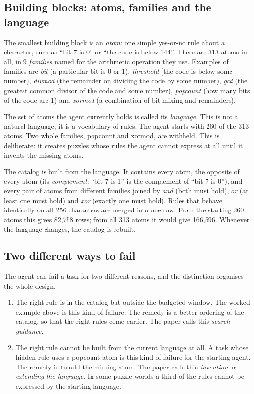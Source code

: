\documentclass[11pt]{article}
\begin{document}
\subsection{Building blocks: atoms, families and the language}

The smallest building block is an \emph{atom}: one simple yes-or-no rule about a character, such as ``bit 7 is 0'' or ``the code is below 144''. There are 313 atoms in all, in 9 \emph{families} named for the arithmetic operation they use. Examples of families are \emph{bit} (a particular bit is 0 or 1), \emph{threshold} (the code is below some number), \emph{divmod} (the remainder on dividing the code by some number), \emph{gcd} (the greatest common divisor of the code and some number), \emph{popcount} (how many bits of the code are 1) and \emph{xormod} (a combination of bit mixing and remainders).

The set of atoms the agent currently holds is called its \emph{language}. This is not a natural language; it is a vocabulary of rules. The agent starts with 260 of the 313 atoms. Two whole families, popcount and xormod, are withheld. This is deliberate: it creates puzzles whose rules the agent cannot express at all until it invents the missing atoms.

The catalog is built from the language. It contains every atom, the opposite of every atom (its \emph{complement}: ``bit 7 is 1'' is the complement of ``bit 7 is 0''), and every pair of atoms from different families joined by \emph{and} (both must hold), \emph{or} (at least one must hold) and \emph{xor} (exactly one must hold). Rules that behave identically on all 256 characters are merged into one row. From the starting 260 atoms this gives 82,758 rows; from all 313 atoms it would give 166,596. Whenever the language changes, the catalog is rebuilt.

\subsection{Two different ways to fail}

The agent can fail a task for two different reasons, and the distinction organises the whole design.

\begin{enumerate}[leftmargin=*]
\item The right rule is in the catalog but outside the budgeted window. The worked example above is this kind of failure. The remedy is a better ordering of the catalog, so that the right rules come earlier. The paper calls this \emph{search guidance}.
\item The right rule cannot be built from the current language at all. A task whose hidden rule uses a popcount atom is this kind of failure for the starting agent. The remedy is to add the missing atom. The paper calls this \emph{invention} or \emph{extending the language}. In some puzzle worlds a third of the rules cannot be expressed by the starting language.
\end{enumerate}
\end{document}
